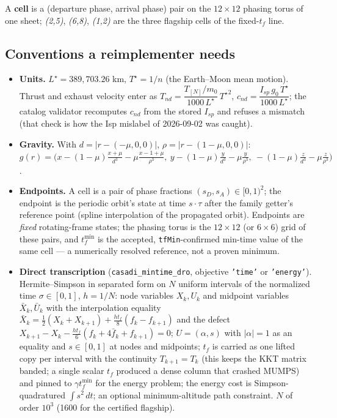 \documentclass[11pt]{article}
\newcommand{\tf}{t_f}\newcommand{\R}{\mathbb{R}}
\newcommand{\file}[1]{\texttt{#1}}
\begin{document}
A \textbf{cell} is a (departure phase, arrival phase) pair on the $12\times12$
phasing torus of one sheet; \emph{(2,5)}, \emph{(6,8)}, \emph{(1,2)} are the
three flagship cells of the fixed-$\tf$ line.


\subsection{Conventions a reimplementer needs}\label{sec:conv}
\begin{itemize}\itemsep2pt
\item \textbf{Units.} $L^\star=389{,}703.26$ km, $T^\star=1/n$ (the Earth--Moon mean motion). Thrust and exhaust velocity enter as
$T_{nd}=\dfrac{T_{[N]}/m_0}{1000\,L^\star}\,{T^\star}^2$, $c_{nd}=\dfrac{I_{sp}\,g_0\,T^\star}{1000\,L^\star}$; the catalog validator recomputes $c_{nd}$ from the stored $I_{sp}$ and refuses a mismatch (that check is how the Isp mislabel of 2026-09-02 was caught).
\item \textbf{Gravity.} With $d=|r-(-\mu,0,0)|$, $\rho=|r-(1-\mu,0,0)|$:
$g(r)=\big(x-(1-\mu)\tfrac{x+\mu}{d^3}-\mu\tfrac{x-1+\mu}{\rho^3},\ y-(1-\mu)\tfrac{y}{d^3}-\mu\tfrac{y}{\rho^3},\ -(1-\mu)\tfrac{z}{d^3}-\mu\tfrac{z}{\rho^3}\big)$.
\item \textbf{Endpoints.} A cell is a pair of phase fractions $(s_D,s_A)\in[0,1)^2$; the endpoint is the periodic orbit's state at time $s\cdot\tau$ after the family getter's reference point (spline interpolation of the propagated orbit). Endpoints are \emph{fixed} rotating-frame states; the phasing torus is the $12\times12$ (or $6\times6$) grid of these pairs, and $\tf^{\min}$ is the accepted, \file{tfMin}-confirmed min-time value of the same cell --- a numerically resolved reference, not a proven minimum.
\item \textbf{Direct transcription} (\file{casadi\_mintime\_dro}, objective \texttt{'time'} or \texttt{'energy'}). Hermite--Simpson in separated form on $N$ uniform intervals of the normalized time $\sigma\in[0,1]$, $h=1/N$: node variables $X_k,U_k$ and midpoint variables $\bar X_k,\bar U_k$ with the interpolation equality $\bar X_k=\tfrac12(X_k+X_{k+1})+\tfrac{h\tf}{8}(f_k-f_{k+1})$ and the defect $X_{k+1}-X_k-\tfrac{h\tf}{6}(f_k+4\bar f_k+f_{k+1})=0$; $U=(\alpha,s)$ with $|\alpha|=1$ as an equality and $s\in[0,1]$ at nodes and midpoints; $\tf$ is carried as one lifted copy per interval with the continuity $T_{k+1}=T_k$ (this keeps the KKT matrix banded; a single scalar $\tf$ produced a dense column that crashed MUMPS) and pinned to $\gamma\tf^{\min}$ for the energy problem; the energy cost is Simpson-quadratured $\int s^2\,dt$; an optional minimum-altitude path constraint. $N$ of order $10^3$ (1600 for the certified flagship).

\end{itemize}
\end{document}
